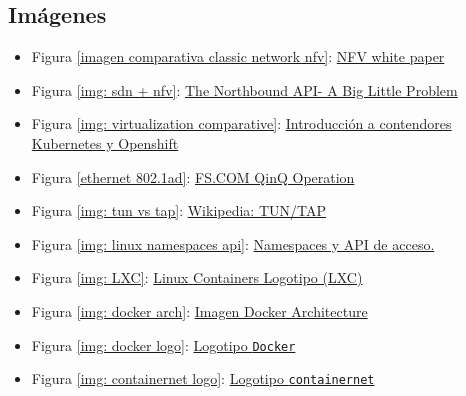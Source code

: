 \documentclass[a4paper, oneside, 12pt]{book}
\begin{document}
	\subsection*{Imágenes}
	\begin{itemize}
		\item Figura \ref{imagen comparativa classic network nfv}:
		\label{img: nfv vs classic}
		\href{https://portal.etsi.org/nfv/nfv_white_paper.pdf}{NFV white paper}
		
		\item Figura \ref{img: sdn + nfv}:
		\label{img: sdn vs nfv osi}
		\href{https://networkstatic.net/the-northbound-api-2/}{The Northbound API- A Big Little Problem}
		
		\item Figura \ref{img: virtualization comparative}: 
		\label{img: vm vs container}
		\href{https://github.com/mgarzago/CodeAndNotes/wiki/Introducci%C3%B3n-a-Contenedores%2C-Kubernetes-y-Openshift}{Introducción a contendores Kubernetes y Openshift}
		
		\item Figura \ref{ethernet 802.1ad}:
		\label{img: frame ethernet 802.1ad}
		\href{https://img-en.fs.com/file/user_manual/s3800-series-qinq-operation.pdf}{FS.COM QinQ Operation}
		
		\item Figura \ref{img: tun vs tap}: 
		\label{bib_img: tun tap}
		\href{https://en.wikipedia.org/wiki/TUN/TAP}{Wikipedia: TUN/TAP}
		
		\item Figura \ref{img: linux namespaces api}:
		\label{bib:img1}\href{https://8gwifi.org/docs/linux-namespace.jsp}{Namespaces y API de acceso.}
		
		\item Figura \ref{img: LXC}:
		\label{bib_img: lxc logo}
		\href{https://linuxcontainers.org/}{Linux Containers Logotipo (LXC)}
		
		\item Figura \ref{img: docker arch}:
		\label{bib_img: docker arch}
		\href{https://docs.docker.com/get-started/overview/}{Imagen Docker Architecture}
		
		\item Figura \ref{img: docker logo}:
		\label{bib_img: docker logo}
		\href{https://commons.wikimedia.org/wiki/File:Docker_(container_engine)_logo.png}{Logotipo \texttt{Docker}}
		
		\item Figura \ref{img: containernet logo}:
		\label{bib_img: containernet logo}
		\href{https://github.com/containernet/containernet}{Logotipo \texttt{containernet}}
	\end{itemize}
\end{document}
